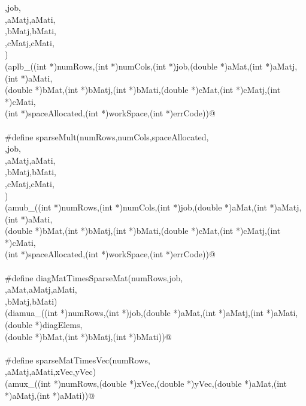 \documentclass[12pt]{article}
\begin{document}
\begin{flushleft}
\begin{minipage}{\linewidth}
\begin{list}{}{}
\mbox{}\verb@workSpace,job, \@\\
\mbox{}\verb@aMat,aMatj,aMati, \@\\
\mbox{}\verb@bMat,bMatj,bMati, \@\\
\mbox{}\verb@cMat,cMatj,cMati, \@\\
\mbox{}\verb@errCode) \@\\
\mbox{}\verb@(aplb_((int *)numRows,(int *)numCols,(int *)job,(double  *)aMat,(int *)aMatj,(int *)aMati, \@\\
\mbox{}\verb@(double *)bMat,(int *)bMatj,(int *)bMati,(double *)cMat,(int *)cMatj,(int *)cMati, \@\\
\mbox{}\verb@(int *)spaceAllocated,(int *)workSpace,(int *)errCode))@\\
\mbox{}\verb@@\\
\mbox{}\verb@#define sparseMult(numRows,numCols,spaceAllocated, \@\\
\mbox{}\verb@workSpace,job, \@\\
\mbox{}\verb@aMat,aMatj,aMati, \@\\
\mbox{}\verb@bMat,bMatj,bMati, \@\\
\mbox{}\verb@cMat,cMatj,cMati, \@\\
\mbox{}\verb@errCode) \@\\
\mbox{}\verb@(amub_((int *)numRows,(int *)numCols,(int *)job,(double *)aMat,(int *)aMatj,(int *)aMati, \@\\
\mbox{}\verb@(double *)bMat,(int *)bMatj,(int *)bMati,(double *)cMat,(int *)cMatj,(int *)cMati, \@\\
\mbox{}\verb@(int *)spaceAllocated,(int *)workSpace,(int *)errCode))@\\
\mbox{}\verb@@\\
\mbox{}\verb@#define diagMatTimesSparseMat(numRows,job, \@\\
\mbox{}\verb@diagElems,aMat,aMatj,aMati, \@\\
\mbox{}\verb@bMat,bMatj,bMati) \@\\
\mbox{}\verb@(diamua_((int *)numRows,(int *)job,(double *)aMat,(int *)aMatj,(int *)aMati,(double *)diagElems, \@\\
\mbox{}\verb@(double *)bMat,(int *)bMatj,(int *)bMati))@\\
\mbox{}\verb@@\\
\mbox{}\verb@#define sparseMatTimesVec(numRows, \@\\
\mbox{}\verb@aMat,aMatj,aMati,xVec,yVec) \@\\
\mbox{}\verb@(amux_((int *)numRows,(double *)xVec,(double *)yVec,(double *)aMat,(int *)aMatj,(int *)aMati))@\\

\end{list}
\end{minipage}
\end{flushleft}
\end{document}
